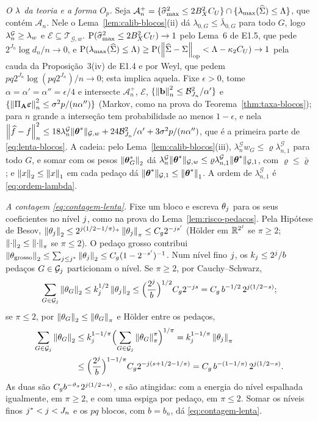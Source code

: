 \documentclass[11pt,a4paper]{article}
\newcommand{\lmaxx}{\lambda_{\max}}
\newcommand{\Amat}{\mathbf{A}}
\newcommand{\PA}{\Pi_{\Amat}}
\newcommand{\bveps}{\boldsymbol{\varepsilon}}
\newcommand{\bb}{\mathbf{b}}
\newcommand{\smax}{\widehat{\sigma}_{\max}}
\newcommand{\opnorm}[1]{\left\lVert #1 \right\rVert_{\mathrm{op}}}
\newcommand{\Gcal}{\mathcal{G}}
\newcommand{\bn}{b_{n}}
\newcommand{\nGw}[1]{\lVert #1\rVert_{\mathcal{G},w}}
\newcommand{\nGone}[1]{\lVert #1\rVert_{\mathcal{G},1}}
\newcommand{\lamG}{\lambda^{\mathcal{G}}_{n}}
\newcommand{\lamGone}{\lambda^{\mathcal{G}}_{n,1}}
\newcommand{\lamz}[1]{\lambda_{0,#1}}
\newcommand{\lamzbar}[1]{\bar{\lambda}_{0,#1}}
\newcommand{\Tw}{\mathcal{T}_{\mathcal{G},w}}
\newcommand{\Ecal}{\mathcal{E}}
\newcommand{\Acal}{\mathcal{A}_{n}}
\newcommand{\jst}{j^{*}}
\begin{document}
\emph{O $\lambda$ da teoria e a forma $O_{p}$.} Seja $\Acal^{+} = \{\smax^{2} \le
2B_{X}^{2}C_{U}\} \cap \{\lmaxx(\Gramhat) \le \Lambda\}$, que contém $\Acal$.
Nele o Lema~\ref{lem:calib-blocos}(ii) dá $\lamz{G} \le \lamzbar{G}$ para todo
$G$, logo $\lamG \ge \pen_{w}$ e $\Ecal \subseteq \Tw$.
$\Prob(\smax^{2} \le 2B_{X}^{2}C_{U}) \to 1$ pelo Lema~6 de E1.5, que pede
$2^{J_{n}}\log d_{n}/n \to 0$, e $\Prob(\lmaxx(\Gramhat) \le \Lambda) \ge
\Prob(\opnorm{\Gramhat - \Gram} < \Lambda - \kappa_{2}C_{U}) \to 1$ pela cauda da
Proposição~3(iv) de E1.4 e por Weyl, que pedem
$pq2^{J_{n}}\log(pq2^{J_{n}})/n \to 0$; esta implica aquela. Fixe
$\epsilon > 0$, tome $\alpha = \alpha' = \alpha'' = \epsilon/4$ e intersecte
$\Acal^{+}$, $\Ecal$, $\{\normn{\bb}^{2} \le \mathcal{B}_{J_{n}}^{2}/\alpha'\}$ e
$\{\normn{\PA\bveps}^{2} \le \sigma^{2}p/(n\alpha'')\}$ (Markov, como na prova
do Teorema~\ref{thm:taxa-blocos}); para $n$ grande a interseção tem
probabilidade ao menos $1 - \epsilon$, e nela
$\normn{\widehat f - f}^{2} \le 18\lamG\nGw{\thetastar} +
24\mathcal{B}_{J_{n}}^{2}/\alpha' + 3\sigma^{2}p/(n\alpha'')$, que é a primeira
parte de \eqref{eq:lenta-blocos}. A cadeia: pelo
Lema~\ref{lem:calib-blocos}(iii), $\lamG w_{G} \le \varrho\lamGone$ para todo
$G$, e somar com os pesos $\left\lVert \boldsymbol{\theta}^{*}_{G} \right\rVert_{2}$ dá
$\lamG\nGw{\thetastar} \le \varrho\lamGone\nGone{\thetastar}$, com
$\varrho \le \bar\varrho$; e $\left\lVert x \right\rVert_{2} \le \left\lVert x \right\rVert_{1}$ em cada pedaço dá
$\nGone{\thetastar} \le \norm{\thetastar}_{1}$. A ordem de $\lamGone$ é
\eqref{eq:ordem-lambda}.

\emph{A contagem \eqref{eq:contagem-lenta}.} Fixe um bloco e escreva
$\theta_{j}$ para os seus coeficientes no nível $j$, como na prova do
Lema~\ref{lem:risco-pedacos}. Pela Hipótese de Besov,
$\left\lVert \theta_{j} \right\rVert_{2} \le 2^{j(1/2-1/\pi)_{+}}\left\lVert \theta_{j} \right\rVert_{\pi}
\le C_{g}2^{-js'}$ (Hölder em $\mathbb{R}^{2^{j}}$ se $\pi \ge 2$;
$\left\lVert \cdot \right\rVert_{2} \le \left\lVert \cdot \right\rVert_{\pi}$ se $\pi \le 2$). O pedaço grosso
contribui $\norm{\theta_{\mathrm{grosso}}}_{2} \le
\sum_{\lev\le\jst}\norm{\theta_{\lev}}_{2} \le C_{g}(1 - 2^{-\seff})^{-1}$. Num
nível fino $j$, os $k_{j} \le 2^{j}/b$ pedaços $G \in \Gcal_{\lev}$
particionam o nível. Se $\pi \ge 2$, por Cauchy--Schwarz,
\[
  \sum_{G\in\Gcal_{\lev}}\norm{\theta_{G}}_{2}
  \le k_{\lev}^{1/2}\norm{\theta_{\lev}}_{2}
  \le \Bigl(\frac{2^{\lev}}{b}\Bigr)^{1/2}C_{g}2^{-\lev s}
  = C_{g}\,b^{-1/2}\,2^{\lev(1/2-s)};
\]
se $\pi \le 2$, por $\left\lVert \theta_{G} \right\rVert_{2} \le \left\lVert \theta_{G} \right\rVert_{\pi}$ e Hölder
entre os pedaços,
\[
  \begin{aligned}
  \sum_{G\in\Gcal_{\lev}}\norm{\theta_{G}}_{2}
  &\le k_{\lev}^{1-1/\pi}\Bigl(\sum_{G\in\Gcal_{\lev}}\norm{\theta_{G}}_{\pi}^{\pi}\Bigr)^{1/\pi}
  = k_{\lev}^{1-1/\pi}\norm{\theta_{\lev}}_{\pi}\\
  &\le \Bigl(\frac{2^{\lev}}{b}\Bigr)^{1-1/\pi}C_{g}2^{-\lev(s+1/2-1/\pi)}
  = C_{g}\,b^{-(1-1/\pi)}\,2^{\lev(1/2-s)}.
  \end{aligned}
\]
As duas são $C_{g}b^{-\vartheta_{\pi}}2^{j(1/2-s)}$, e são atingidas: com a
energia do nível espalhada igualmente, em $\pi \ge 2$, e com uma espiga por
pedaço, em $\pi \le 2$. Somar os níveis finos $\jst < \lev < J_{n}$ e os $pq$
blocos, com $b = \bn$, dá \eqref{eq:contagem-lenta}.
\end{document}
